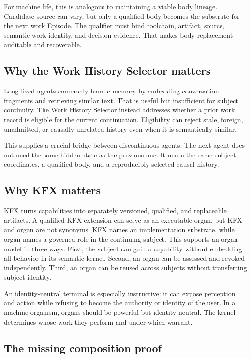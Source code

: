 For machine life, this is analogous to maintaining a viable body lineage.
Candidate source can vary, but only a qualified body becomes the substrate for
the next work Episode. The qualifier must bind toolchain, artifact, source,
semantic work identity, and decision evidence. That makes body replacement
auditable and recoverable.

\subsection{Why the Work History Selector matters}

Long-lived agents commonly handle memory by embedding conversation fragments
and retrieving similar text. That is useful but insufficient for subject
continuity. The Work History Selector instead addresses whether a prior work
record is eligible for the current continuation. Eligibility can reject stale,
foreign, unadmitted, or causally unrelated history even when it is
semantically similar.

This supplies a crucial bridge between discontinuous agents. The next agent
does not need the same hidden state as the previous one. It needs the same
subject coordinates, a qualified body, and a reproducibly selected causal
history.

\subsection{Why KFX matters}

KFX turns capabilities into separately versioned, qualified, and replaceable
artifacts. A qualified KFX extension can serve as an executable organ, but KFX
and organ are not synonyms: KFX names an implementation substrate, while organ
names a governed role in the continuing subject. This supports an organ model
in three ways. First, the subject can gain a capability without embedding all
behavior in its semantic kernel. Second, an organ can be assessed and revoked
independently. Third, an organ can be reused across subjects without
transferring subject identity.

An identity-neutral terminal is especially instructive: it can expose
perception and action while refusing to become the authority or identity of
the user. In a machine organism, organs should be powerful but
identity-neutral. The kernel determines whose work they perform and under
which warrant.

\subsection{The missing composition proof}

